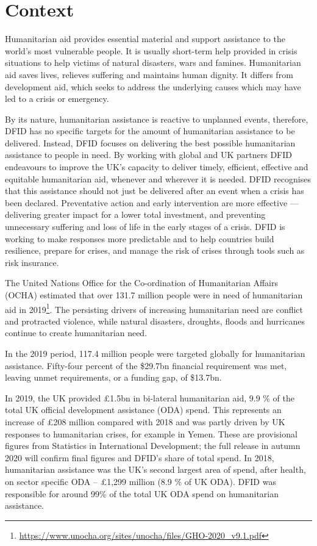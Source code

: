 \section{Context}

Humanitarian aid provides essential material and support assistance to the world's most vulnerable people. %
It is usually short-term help provided in crisis situations to help victims of natural disasters, wars and famines. %
Humanitarian aid saves lives, relieves suffering and maintains human dignity. %
It differs from development aid, which seeks to address the underlying causes which may have led to a crisis or emergency. %

By its nature, humanitarian assistance is reactive to unplanned events, therefore, DFID has no specific targets for the amount of humanitarian assistance to be delivered. %
Instead, DFID focuses on delivering the best possible humanitarian assistance to people in need. %
By working with global and UK partners DFID endeavours to improve the UK's capacity to deliver timely, efficient, effective and equitable humanitarian aid, whenever and wherever it is needed. %
DFID recognises that this assistance should not just be delivered after an event when a crisis has been declared. %
Preventative action and early intervention are more effective --- delivering greater impact for a lower total investment, and preventing unnecessary suffering and loss of life in the early stages of a crisis. %
DFID is working to make responses more predictable and to help countries build resilience, prepare for crises, and manage the risk of crises through tools such as risk insurance. %

The United Nations Office for the Co-ordination of Humanitarian Affairs (OCHA) estimated that over 131.7 million people were in need of humanitarian aid in 2019\footnote{\href{https://www.unocha.org/sites/unocha/files/GHO-2020_v9.1.pdf}{https://www.unocha.org/sites/unocha/files/GHO-2020\_v9.1.pdf}}. %
The persisting drivers of increasing humanitarian need are conflict and protracted violence, while natural disasters, droughts, floods and hurricanes continue to create humanitarian need. %

In the 2019 period, 117.4 million people were targeted globally for humanitarian assistance. %
Fifty-four percent of the \$29.7bn financial requirement was met, leaving unmet requirements, or a funding gap, of \$13.7bn. %

In 2019, the UK provided \pounds 1.5bn in bi-lateral humanitarian aid, 9.9 \% of the total UK official development assistance (ODA) spend. %
This represents an increase of \pounds 208 million compared with 2018 and was partly driven by UK responses to humanitarian crises, for example in Yemen. %
These are provisional figures from Statistics in International Development; the full release in autumn 2020 will confirm final figures and DFID's share of total spend. %
In 2018, humanitarian assistance was the UK's second largest area of spend, after health, on sector specific ODA – \pounds 1,299 million (8.9 \% of UK ODA). %
DFID was responsible for around 99\% of the total UK ODA spend on humanitarian assistance. %

